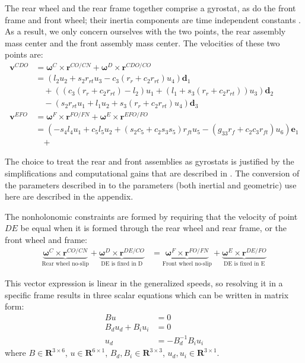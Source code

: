 \documentclass[letterpaper,11pt]{article}
\newcommand{\bs}[1]{ \boldsymbol{ #1 } }
\begin{document}
The rear wheel and the rear frame together comprise a gyrostat, as do the front frame
and front wheel; their inertia components are time independent constants
\cite{Wittenburg1977}.  As a result, we only concern ourselves with the two
points, the rear assembly mass center and the front assembly mass center.  The
velocities of these two points are:
\begin{align*}
  \bs{v}^{CDO} & = \bs{\omega}^C \times \bs{r}^{CO/CN} + \bs{\omega}^D \times
  \bs{r}^{CDO/CO}\\
  & = (l_2 u_2 + s_2 r_{rt} u_3 - c_3 (r_r + c_2 r_{rt}) u_4) \bs{d}_1 \\
  & \quad +
  ( (c_3 (r_r + c_2 r_{rt}) - l_2) u_1 + (l_1 + s_3 (r_r + c_2 r_{rt})) u_3) \bs{d}_2 \\
  & \quad -
  (s_2 r_{rt} u_1 + l_1 u_2 + s_3 (r_r + c_2 r_{rt}) u_4) \bs{d}_3\\
  \bs{v}^{EFO} & = \bs{\omega}^F \times \bs{r}^{FO/FN} + \bs{\omega}^E \times
  \bs{r}^{EFO/FO}\\
  & = (-s_4 l_4 u_1 + c_5 l_5 u_2 + (s_2 c_5 + c_2 s_3 s_5) r_{ft} u_5 -
  (g_{33} r_f + c_2 c_3 r_{ft}) u_6) \bs{e}_1 \\
  & \quad +
\end{align*}

The choice to treat the rear and front assemblies as gyrostats is justified by
the simplifications and computational gains that are described in
\cite{Mitiguy2001}.  The conversion of the parameters described in
\cite{Meijaard2007} to the parameters (both inertial and geometric) use here
are described in the appendix.

The nonholonomic constraints are formed by requiring that the velocity of point
$DE$ be equal when it is formed through the rear wheel and rear frame, or the
front wheel and frame:
\begin{align*}
  \underbrace{\bs{\omega}^C \times \bs{r}^{CO/CN}}_{\text{Rear wheel no-slip}}
  +
  \underbrace{\bs{\omega}^D \times \bs{r}^{DE/CO}}_{\text{DE is fixed in D}}
  & =
  \underbrace{\bs{\omega}^F \times \bs{r}^{FO/FN}}_{\text{Front wheel no-slip}}
  +
  \underbrace{\bs{\omega}^E \times \bs{r}^{DE/FO}}_{\text{DE is fixed in E}}
\end{align*}

This vector expression is linear in the generalized speeds, so resolving it in
a specific frame results in three scalar equations which can be written in
matrix form:
\begin{align*}
  B u & = 0 \\
  B_d u_d + B_i u_i & = 0 \\
  u_d & = -B_d^{-1} B_i u_i
\end{align*}
where $B \in \mathbf{R}^{3 \times 6}$, $u \in \mathbf{R}^{6 \times 1}$, $B_d, B_i \in
\mathbf{R}^{3 \times 3}$, $u_d, u_i \in \mathbf{R}^{3 \times 1}$.
\end{document}
